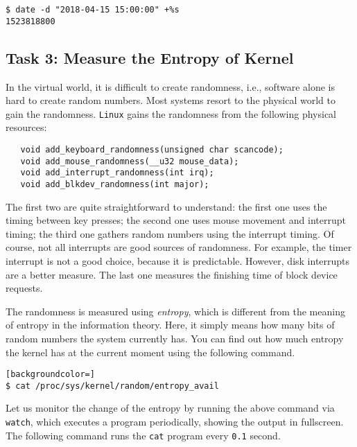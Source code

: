 \begin{lstlisting}
$ date -d "2018-04-15 15:00:00" +%s
1523818800
\end{lstlisting}




\subsection{Task 3: Measure the Entropy of Kernel}

In the virtual world, it is difficult to create randomness, i.e., software alone is hard to
create random numbers. Most systems resort to the physical world to gain the randomness. 
\texttt{Linux} gains the randomness from the following physical resources: 


\begin{lstlisting}
   void add_keyboard_randomness(unsigned char scancode);
   void add_mouse_randomness(__u32 mouse_data);
   void add_interrupt_randomness(int irq);
   void add_blkdev_randomness(int major);
\end{lstlisting}

The first two are quite straightforward to understand: the first
one uses the timing between key presses;  the second one
uses mouse movement and interrupt timing; the third one
gathers random numbers using the interrupt timing.  Of course,
not all interrupts are good sources of randomness.  
For example, the timer interrupt is not a good choice, because it 
is predictable. However, disk interrupts are a better measure.  
The last one measures the finishing time of block device requests.


The randomness is measured using {\em entropy}, which is different from 
the meaning of entropy in the information theory. Here, it simply 
means how many bits of random numbers the system currently has. 
You can find out how much
entropy the kernel has at the current moment using the following 
command. 

\begin{lstlisting}[backgroundcolor=]
$ cat /proc/sys/kernel/random/entropy_avail
\end{lstlisting}

Let us monitor the change of the entropy by 
running the above command via \texttt{watch}, which 
executes a program periodically, showing the output 
in fullscreen. The following command 
runs the \texttt{cat} program every \texttt{0.1}
second. 

